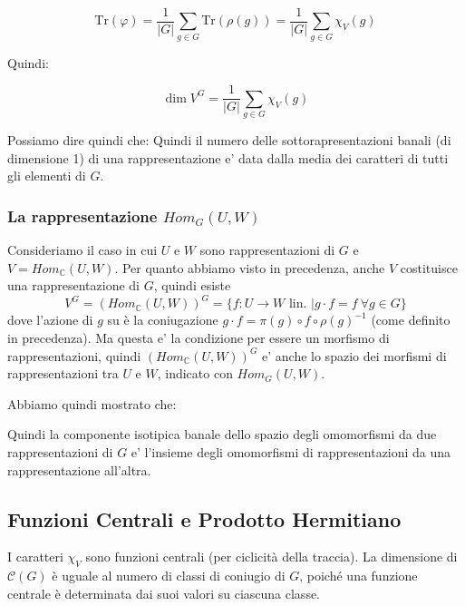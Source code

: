 $$\mathrm{Tr}(\varphi) = \frac{1}{|G|}\sum_{g \in G} \mathrm{Tr}(\rho(g)) = \frac{1}{|G|}\sum_{g \in G} \chi_V(g)$$

Quindi:

$$\dim V^G = \frac{1}{|G|}\sum_{g \in G} \chi_V(g)$$

Possiamo dire quindi che:
Quindi il numero delle sottorapresentazioni banali (di dimensione 1) di una rappresentazione e' data dalla media dei caratteri di tutti gli elementi di $ G $.

\subsubsection{La rappresentazione $ Hom_G(U,W) $}
Consideriamo il caso in cui $ U $ e $ W $ sono rappresentazioni di $ G $ e $ V = Hom_\mathbb{C}(U,W) $. Per quanto abbiamo visto in precedenza, anche $ V $ costituisce una rappresentazione di $ G $, quindi esiste
\[
  V^G = (Hom_\mathbb{C}(U,W))^G = \{f: U \to W \text{ lin. } | g \cdot f = f\ \forall g \in G\}
\]
dove l'azione di $g$ su è la coniugazione $g \cdot f = \pi(g) \circ f \circ \rho(g)^{-1}$ (come definito in precedenza). Ma questa e' la condizione per essere un morfismo di rappresentazioni, quindi $ (Hom_\mathbb{C}(U,W))^G $ e' anche lo spazio dei morfismi di rappresentazioni tra $ U $ e $ W $, indicato con $ Hom_G(U,W) $.

Abbiamo quindi mostrato che:


Quindi la componente isotipica banale dello spazio degli omomorfismi da due rappresentazioni di $ G $ e' l'insieme degli omomorfismi di rappresentazioni da una rappresentazione all'altra.

\subsection{Funzioni Centrali e Prodotto Hermitiano}
 I caratteri $\chi_V$ sono funzioni centrali (per ciclicità della traccia). La dimensione di $\mathcal{C}(G)$ è uguale al numero di classi di coniugio di $G$, poiché una funzione centrale è determinata dai suoi valori su ciascuna classe.\\

